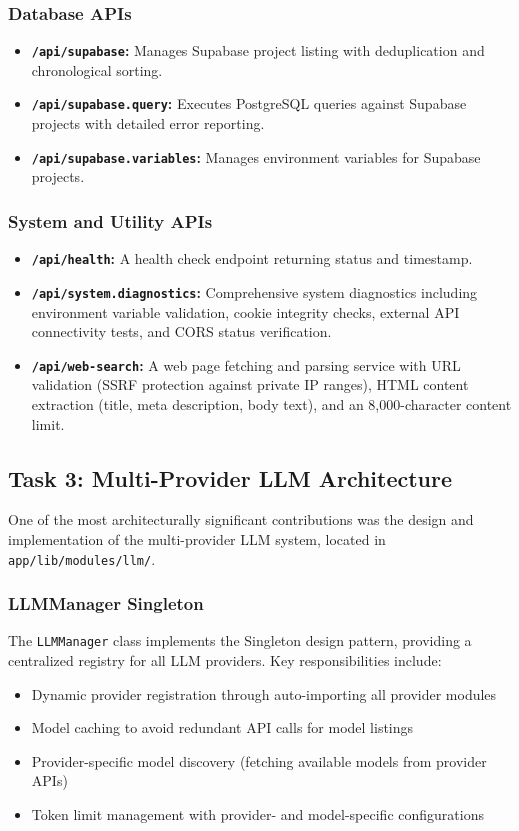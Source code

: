 \documentclass[12pt,a4paper,openany]{report}
\begin{document}
\subsubsection{Database APIs}
\begin{itemize}
    \item \textbf{\texttt{/api/supabase}:} Manages Supabase project listing with deduplication and chronological sorting.
    \item \textbf{\texttt{/api/supabase.query}:} Executes PostgreSQL queries against Supabase projects with detailed error reporting.
    \item \textbf{\texttt{/api/supabase.variables}:} Manages environment variables for Supabase projects.
\end{itemize}

\subsubsection{System and Utility APIs}
\begin{itemize}
    \item \textbf{\texttt{/api/health}:} A health check endpoint returning status and timestamp.
    \item \textbf{\texttt{/api/system.diagnostics}:} Comprehensive system diagnostics including environment variable validation, cookie integrity checks, external API connectivity tests, and CORS status verification.
    \item \textbf{\texttt{/api/web-search}:} A web page fetching and parsing service with URL validation (SSRF protection against private IP ranges), HTML content extraction (title, meta description, body text), and an 8,000-character content limit.
\end{itemize}

\subsection{Task 3: Multi-Provider LLM Architecture}

One of the most architecturally significant contributions was the design and implementation of the multi-provider LLM system, located in \texttt{app/lib/modules/llm/}.

\subsubsection{LLMManager Singleton}
The \texttt{LLMManager} class implements the Singleton design pattern, providing a centralized registry for all LLM providers. Key responsibilities include:
\begin{itemize}
    \item Dynamic provider registration through auto-importing all provider modules
    \item Model caching to avoid redundant API calls for model listings
    \item Provider-specific model discovery (fetching available models from provider APIs)
    \item Token limit management with provider- and model-specific configurations
\end{itemize}
\end{document}
